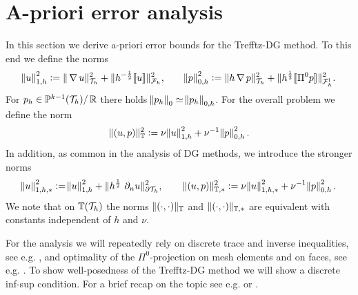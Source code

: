 \documentclass[pdflatex,sn-mathphys,Numbered]{sn-jnl}%
\theoremstyle{remark}%
\theoremstyle{definition}%
\begin{document}
\section{A-priori error analysis} \label{sec:analysis} In this section
we derive a-priori error bounds for the Trefftz-DG method. To this end
we define the norms
\begin{align*}
  \norm{u}_{1,h}^2 := \Vert \operatorname{\nabla} u \Vert_{{\mathcal{T}_h}}^2 +   \Vert  h^{-\frac12} [\![u]\!] \Vert^2_{{\mathcal{F}_h}}, \qquad 
  \norm{p}_{0,h}^2:= \Vert  h \operatorname{\nabla} p \Vert_{{\mathcal{T}_h}}^2 + \Vert  h^\frac12 [\![\Pi^0 p]\!] \Vert_{{\mathcal{F}_h^{\text{i}}}}^2.
\end{align*}
For $p_h \in \mathbb{P}^{k-1}({\mathcal{T}_h}) /\, \mathbb{R}$ there holds $\norm{p_h}_0 \simeq \norm{p_h}_{0,h}$.
For the overall problem we define the norm
\begin{align*}
  \Vert (u,p) \Vert_{\mathbb{T}}^2 := \nu \norm{u}_{1,h}^2 + \nu^{-1} \norm{p}_{0,h}^2.
\end{align*}
In addition, as common in the analysis of DG methods, we introduce the stronger norms
\begin{align*}
  \norm{u}_{1,h,\ast}^2 := \norm{u}_{1,h}^2 + \nrm{ h^{\frac12} \ \partial_n u}^2_{\partial \Th}, \qquad 
  \nrm{(u,p)}_{\TT,\ast}^2 := \nu \norm{u}_{1,h,\ast}^2 + \nu^{-1} \norm{p}_{0,h}^2.
\end{align*}
We note that on $\mathbb{T}({\mathcal{T}_h})$  the norms $\Vert (\cdot,\cdot) \Vert_{\mathbb{T}}$
and $\Vert (\cdot,\cdot) \Vert_{\mathbb{T},\ast}$ are equivalent with constants independent of $h$ and $\nu$.

For the analysis we will repeatedly rely on discrete trace and inverse inequalities, see e.g. \cite[Lemma 1.44-1.46]{di2011mathematical}, and optimality of the $\Pi^0$-projection on mesh elements and on faces, see e.g. \cite[Lemma 1.58 \& 1.59]{di2011mathematical}.
To show well-posedness of the Trefftz-DG method we will show a discrete inf-sup condition. For a brief recap on the topic see e.g. \cite[Section 1.3.2]{di2011mathematical} or \cite[Section 3.1 and 3.3]{zbMATH06625569}.
\end{document}
